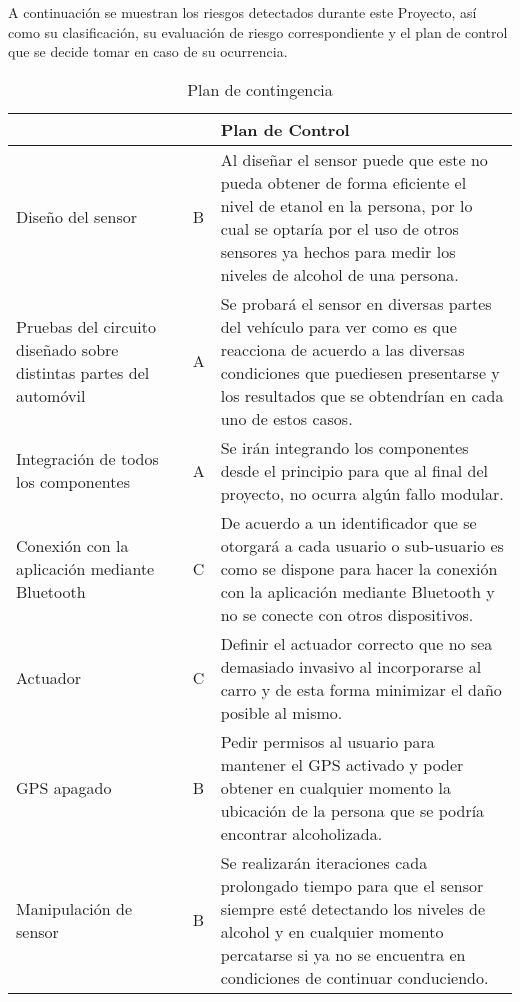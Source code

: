 A continuación se muestran los riesgos detectados durante este Proyecto, así como su clasificación, su evaluación de riesgo correspondiente y el plan de control que se decide tomar en caso de su ocurrencia.

\begin{center}
\begin{table}[!htb]
\centering
\begin{tabular}{|p{4cm}|p{2cm}|p{2cm}|p{5cm}|}
    \hline
    \centering {\bfseries Tipo de Riesgo}  & \centering {\bfseries CR} & \centering {\bfseries VR} & {\bfseries Plan de Control} \\ \hline
    
    \centering Diseño del sensor & \centering 2 & \centering B & Al diseñar el sensor puede que este no pueda obtener de forma eficiente el nivel de etanol en la persona, por lo cual se optaría por el uso de otros sensores ya hechos para medir los niveles de alcohol de una persona.\\ \hline
    
    \centering Pruebas del circuito diseñado sobre distintas partes del automóvil & \centering 1 & \centering A & Se probará el sensor en diversas partes del vehículo para ver como es que reacciona de acuerdo a las diversas condiciones que puediesen presentarse y los resultados que se obtendrían en cada uno de estos casos.\\ \hline
    
    \centering Integración de todos los componentes & \centering 3 & \centering A & Se irán integrando los componentes desde el principio para que al final del proyecto, no ocurra algún fallo modular.\\ \hline
    
    \centering Conexión con la aplicación mediante Bluetooth & \centering 2 & \centering C & De acuerdo a un identificador que se otorgará a cada usuario o sub-usuario es como se dispone para hacer la conexión con la aplicación mediante Bluetooth y no se conecte con otros dispositivos.\\ \hline
    
    \centering Actuador & \centering 2 & \centering C & Definir el actuador correcto que no sea demasiado invasivo al incorporarse al carro y de esta forma minimizar el daño posible al mismo.\\ \hline
    
    \centering GPS apagado & \centering 3 & \centering B & Pedir permisos al usuario para mantener el GPS activado y poder obtener en cualquier momento la ubicación de la persona que se podría encontrar alcoholizada.\\ \hline
    
    \centering Manipulación de sensor & \centering 3 & \centering B & Se realizarán iteraciones cada prolongado tiempo para que el sensor siempre esté detectando los niveles de alcohol y en cualquier momento percatarse si ya no se encuentra en condiciones de continuar conduciendo.\\ \hline

\end{tabular}
\caption{Plan de contingencia}
\label{tabla:pobconlimsincolo}
\end{table}
\end{center}
